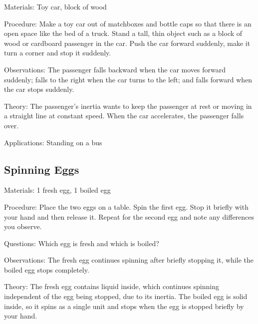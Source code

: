 \begin{multicols}{2}
\begin{description*}
\item[Materials:]{Toy car, block of wood}
\item[Procedure:]{Make a toy car out of matchboxes and bottle caps so that there is an open space like the bed of a truck. Stand a tall, thin object such as a block of wood or cardboard passenger in the car. Push the car forward suddenly, make it turn a corner and stop it suddenly.}
\item[Observations:]{The passenger falls backward when the car moves forward suddenly; falls to the right when the car turns to the left; and falls forward when the car stops suddenly.}
\item[Theory:]{The passenger's inertia wants to keep the passenger at rest or moving in a straight line at constant speed. When the car accelerates, the passenger falls over.}
\item[Applications:]{Standing on a bus}
\end{description*}

\subsection{Spinning Eggs}


\begin{description*}
\item[Materials:]{1 fresh egg, 1 boiled egg}
\item[Procedure:]{Place the two eggs on a table. Spin the first egg. Stop it briefly with your hand and then release it. Repeat for the second egg and note any differences you observe.}
\item[Questions:]{Which egg is fresh and which is boiled?}
\item[Observations:]{The fresh egg continues spinning after briefly stopping it, while the boiled egg stops completely.}
\item[Theory:]{The fresh egg contains liquid inside, which continues spinning independent of the egg being stopped, due to its inertia. The boiled egg is solid inside, so it spins as a single unit and stops when the egg is stopped briefly by your hand.}
\end{description*}


\end{multicols}
